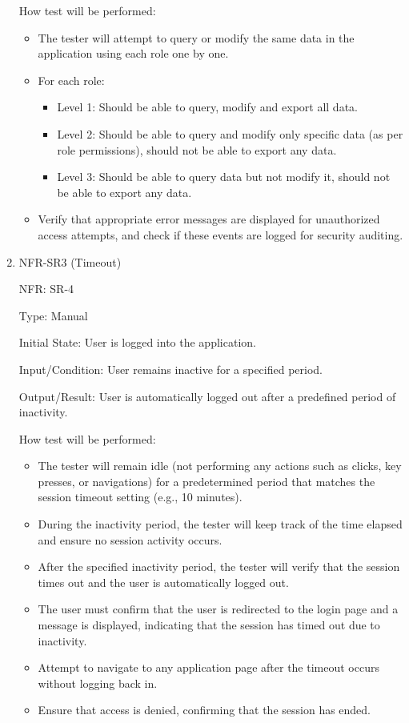 \documentclass[12pt, titlepage]{article}
\begin{document}
\begin{enumerate}
  How test will be performed: 
  \begin{itemize}
    \item The tester will attempt to query or modify the same data in the application
    using each role one by one.
    \item For each role:
    \begin{itemize}
      \item Level 1: Should be able to query, modify and export all data.
      \item Level 2: Should be able to query and modify only specific data
      (as per role permissions), should not be able to export any data.
      \item Level 3: Should be able to query data but not modify it, should not be
      able to export any data.
    \end{itemize}
    \item Verify that appropriate error messages are displayed for unauthorized access
    attempts, and check if these events are logged for security auditing.
  \end{itemize}

\item{NFR-SR3 (Timeout)\\}
  
  NFR: SR-4
  
  Type: Manual
  
  Initial State: User is logged into the application.
  
  Input/Condition: User remains inactive for a specified period.
  
  Output/Result: User is automatically logged out after a predefined period of inactivity.

  How test will be performed: 
  \begin{itemize}
    \item The tester will remain idle (not performing any actions such as clicks, key
    presses, or navigations) for a predetermined period that matches the session timeout
    setting (e.g., 10 minutes).
    \item During the inactivity period, the tester will keep track of the time elapsed
    and ensure no session activity occurs.
    \item After the specified inactivity period, the tester will verify that the session
    times out and the user is automatically logged out.
    \item The user must confirm that the user is redirected to the login page and a message
    is displayed, indicating that the session has timed out due to inactivity.
    \item Attempt to navigate to any application page after the timeout occurs without
    logging back in.
    \item Ensure that access is denied, confirming that the session has ended.
  \end{itemize}


\end{enumerate}
\end{document}
